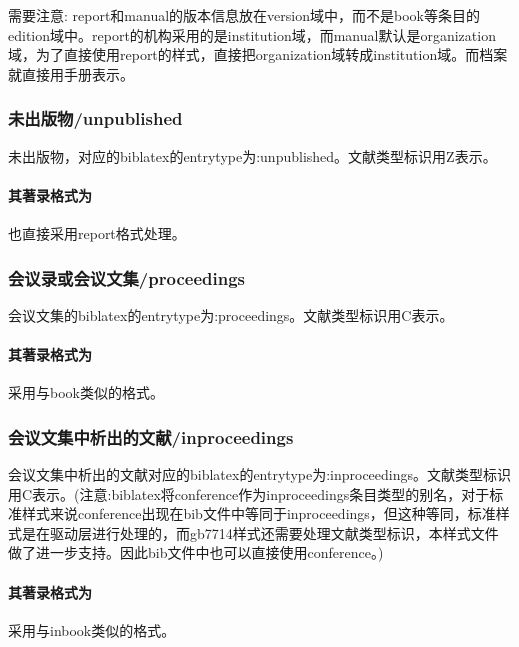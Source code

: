 需要注意: report和manual的版本信息放在version域中，而不是book等条目的edition域中。report的机构采用的是institution域，而manual默认是organization域，为了直接使用report的样式，直接把organization域转成institution域。而档案就直接用手册表示。

\subsubsection{未出版物/unpublished}
\begin{refentry}{}{}
未出版物，对应的biblatex的entrytype为:unpublished。文献类型标识用Z表示。

\paragraph{其著录格式为} 也直接采用report格式处理。
\end{refentry}

\subsubsection{会议录或会议文集/proceedings}
\begin{refentry}{}{}
会议文集的biblatex的entrytype为:proceedings。文献类型标识用C表示。

\paragraph{其著录格式为} 采用与book类似的格式。
\end{refentry}

\subsubsection{会议文集中析出的文献/inproceedings}
\begin{refentry}{}{}
会议文集中析出的文献对应的biblatex的entrytype为:inproceedings。文献类型标识用C表示。(注意:biblatex将conference作为inproceedings条目类型的别名，对于标准样式来说conference出现在bib文件中等同于inproceedings，但这种等同，标准样式是在驱动层进行处理的，而gb7714样式还需要处理文献类型标识，本样式文件做了进一步支持。因此bib文件中也可以直接使用conference。)

\paragraph{其著录格式为} 采用与inbook类似的格式。
\end{refentry}

